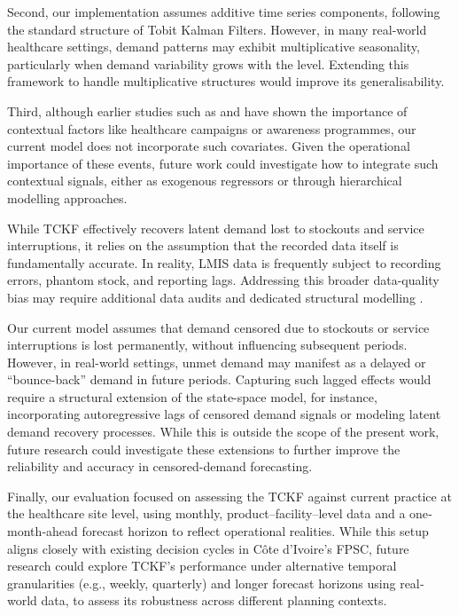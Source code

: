 \documentclass[
  11pt,
  authoryear,
  doubleblind,
  3p]{elsarticle}
\begin{document}
Second, our implementation assumes additive time series components,
following the standard structure of Tobit Kalman Filters. However, in
many real-world healthcare settings, demand patterns may exhibit
multiplicative seasonality, particularly when demand variability grows
with the level. Extending this framework to handle multiplicative
structures would improve its generalisability.

Third, although earlier studies such as \citet{hewage2025} and
\citet{bilal2025} have shown the importance of contextual factors like
healthcare campaigns or awareness programmes, our current model does not
incorporate such covariates. Given the operational importance of these
events, future work could investigate how to integrate such contextual
signals, either as exogenous regressors or through hierarchical
modelling approaches.

While TCKF effectively recovers latent demand lost to stockouts and
service interruptions, it relies on the assumption that the recorded
data itself is fundamentally accurate. In reality, LMIS data is
frequently subject to recording errors, phantom stock, and reporting
lags. Addressing this broader data-quality bias may require additional
data audits and dedicated structural modelling \citep{deboeck2023}.

Our current model assumes that demand censored due to stockouts or
service interruptions is lost permanently, without influencing
subsequent periods. However, in real-world settings, unmet demand may
manifest as a delayed or ``bounce-back'' demand in future periods.
Capturing such lagged effects would require a structural extension of
the state-space model, for instance, incorporating autoregressive lags
of censored demand signals or modeling latent demand recovery processes.
While this is outside the scope of the present work, future research
could investigate these extensions to further improve the reliability
and accuracy in censored-demand forecasting.

Finally, our evaluation focused on assessing the TCKF against current
practice at the healthcare site level, using monthly,
product--facility--level data and a one‐month‐ahead forecast horizon to
reflect operational realities. While this setup aligns closely with
existing decision cycles in Côte d'Ivoire's FPSC, future research could
explore TCKF's performance under alternative temporal granularities
(e.g., weekly, quarterly) and longer forecast horizons using real‐world
data, to assess its robustness across different planning contexts.
\end{document}
